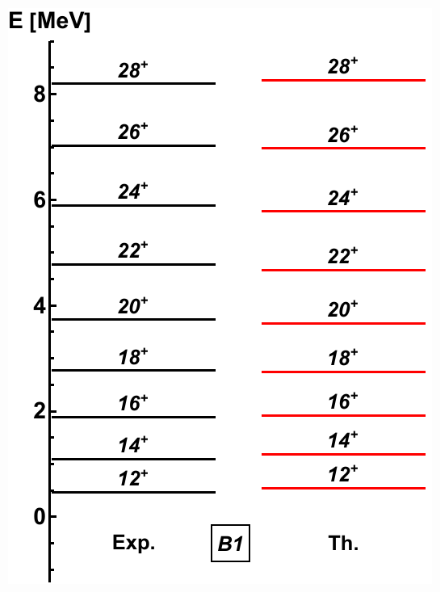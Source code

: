 \documentclass{beamer}
\begin{document}
\begin{frame}
\begin{columns}
\begin{column}{0.25\textwidth}
\begin{figure}
      \includegraphics[scale=0.285]{Figs/ba130-band1.pdf}

\end{figure}
\end{column}
\end{columns}
\end{frame}
\end{document}
